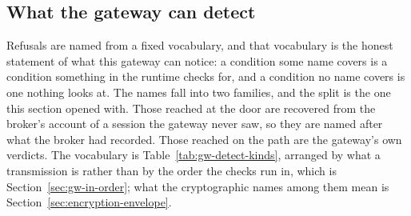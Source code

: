 \documentclass[12pt,a4paper]{report}
\begin{document}
\subsection{What the gateway can detect}
\label{sec:gw-detect-kinds}

Refusals are named from a fixed vocabulary, and that vocabulary is the
honest statement of what this gateway can notice: a condition some name
covers is a condition something in the runtime checks for, and a
condition no name covers is one nothing looks at. The names fall into
two families, and the split is the one this section opened with. Those
reached at the door are recovered from the broker's account of a session
the gateway never saw, so they are named after what the broker had
recorded. Those reached on the path are the gateway's own verdicts. The
vocabulary is Table~\ref{tab:gw-detect-kinds}, arranged by what a
transmission is rather than by the order the checks run in, which is
Section~\ref{sec:gw-in-order}; what the cryptographic names among them
mean is Section~\ref{sec:encryption-envelope}.
\end{document}
